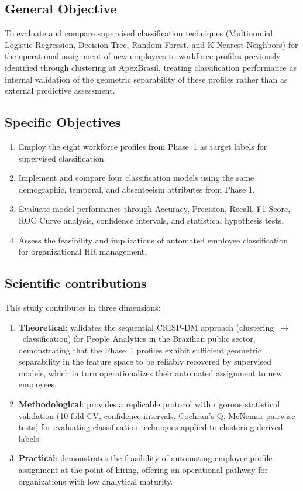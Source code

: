 \documentclass[alpha-refs,english]{RBCA_v3.0}
\begin{document}
\subsection{General Objective} 

To evaluate and compare supervised classification techniques (Multinomial Logistic Regression, Decision Tree, Random Forest, and K-Nearest Neighbors) for the operational assignment of new employees to workforce profiles previously identified through clustering at ApexBrasil, treating classification performance as internal validation of the geometric separability of these profiles rather than as external predictive assessment.

\subsection{Specific Objectives} 

\begin{enumerate}
    \item Employ the eight workforce profiles from Phase~1 as target labels for supervised classification.
    \item Implement and compare four classification models using the same demographic, temporal, and absenteeism attributes from Phase 1. 
    \item Evaluate model performance through Accuracy, Precision, Recall, F1-Score, ROC Curve analysis, confidence intervals, and statistical hypothesis tests.
    \item Assess the feasibility and implications of automated employee classification for organizational HR management.
\end{enumerate}

\subsection{Scientific contributions} This study contributes in three dimensions: 
\begin{enumerate}
    \item \textbf{Theoretical}: validates the sequential CRISP-DM approach (clustering~$\rightarrow$~classification) for People Analytics in the Brazilian public sector, demonstrating that the Phase~1 profiles exhibit sufficient geometric separability in the feature space to be reliably recovered by supervised models, which in turn operationalizes their automated assignment to new employees.
    \item \textbf{Methodological}: provides a replicable protocol with rigorous statistical validation (10-fold CV, confidence intervals, Cochran's Q, McNemar pairwise tests) for evaluating classification techniques applied to clustering-derived labels.
    \item \textbf{Practical}: demonstrates the feasibility of automating employee profile assignment at the point of hiring, offering an operational pathway for organizations with low analytical maturity.
\end{enumerate}
\end{document}
